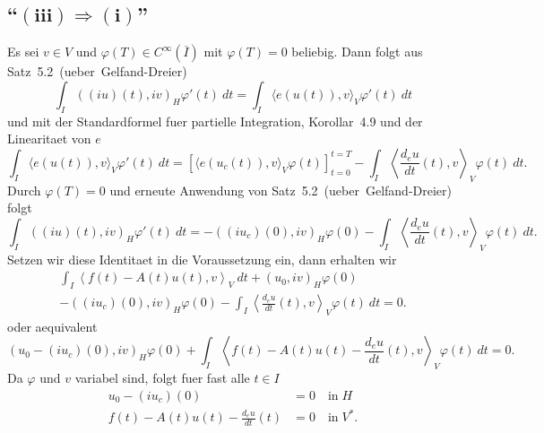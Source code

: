 \documentclass{article}
\begin{document}
\subsection*{``$\bm{(iii) \Rightarrow (i)}$''}

Es sei $v \in V$ und $\varphi(T) \in C^\infty(\overline{I})$ mit $\varphi(T) = 0$ beliebig. Dann folgt aus Satz~5.2~(ueber~Gelfand-Dreier)
\begin{equation*}
  \int_{I} {((iu)(t), iv)}_H \varphi'(t) \ dt
  = \int_{I} {\langle e(u(t)), v \rangle}_V \varphi'(t) \ dt
\end{equation*}
und mit der Standardformel fuer partielle Integration, Korollar~4.9 und der Linearitaet von $e$
\begin{equation*}
  \int_{I} {\langle e(u(t)), v \rangle}_V \varphi'(t) \ dt
  = {[\langle e(u_c(t)), v \rangle_V \varphi(t)]}_{t=0}^{t=T} - \int_{I} {\left\langle \frac{d_e u}{dt} (t), v \right\rangle}_V \varphi(t) \ dt.
\end{equation*}
Durch $\varphi(T) = 0$ und erneute Anwendung von Satz~5.2~(ueber~Gelfand-Dreier) folgt
\begin{equation*}
  \int_{I} {((iu)(t), iv)}_H \varphi'(t) \ dt
  = - {((iu_c)(0), iv)}_H \varphi(0) - \int_{I} {\left\langle \frac{d_e u}{dt} (t), v \right\rangle}_V \varphi(t) \ dt.
\end{equation*}
Setzen wir diese Identitaet in die Voraussetzung ein, dann erhalten wir
\begin{multline*}
  \int_{I} {\left\langle f(t) - A(t) u(t), v \right\rangle}_V \ dt
  + {(u_0, iv)}_H \varphi(0)\\
  - {((iu_c)(0), iv)}_H \varphi(0) - \int_{I} {\left\langle \frac{d_e u}{dt} (t), v \right\rangle}_V \varphi(t) \ dt
  = 0.
\end{multline*}
oder aequivalent
\begin{equation*}
  {(u_0 - (iu_c)(0), iv)}_H \varphi(0) + \int_{I} {\left\langle f(t) - A(t)u(t) - \frac{d_e u}{dt} (t), v \right\rangle}_V \varphi(t) \ dt
  = 0.
\end{equation*}
Da $\varphi$ und $v$ variabel sind, folgt fuer fast alle $t \in I$
\begin{equation*}
  \begin{aligned}
    u_0 - (iu_c)(0) &= 0 \quad \text{in} \; H\\
    f(t) - A(t)u(t) - \frac{d_e u}{dt} (t) &= 0 \quad \text{in} \; V^*.
  \end{aligned}
\end{equation*}
\end{document}
